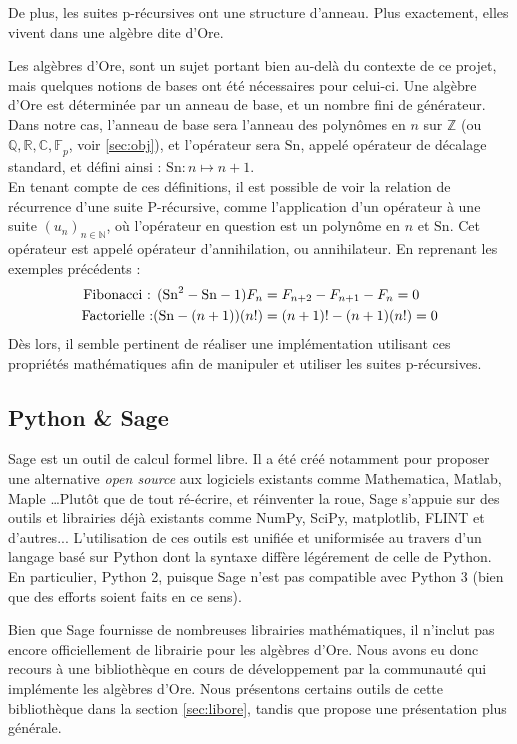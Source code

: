 \documentclass[12pt]{article}
\newcommand{\Sn}{\mathrm{Sn}}
\begin{document}
        De plus, les suites p-récursives ont une structure d'anneau. Plus exactement,
        elles vivent dans une algèbre dite d'Ore.\\
        \par Les algèbres d'Ore, sont un sujet
        portant bien au-delà du contexte de ce projet, mais quelques notions de bases
        ont été nécessaires pour celui-ci. Une algèbre d'Ore est déterminée par un
        anneau de base, et un nombre fini de générateur. Dans notre cas, l'anneau de base
        sera l'anneau des polynômes en $n$ sur $\mathbb Z$ (ou $\mathbb {Q,R,C,F}_p$, voir
        \ref{sec:obj}), et l'opérateur sera $\Sn$, appelé opérateur de décalage standard, et
        défini ainsi : $\Sn : n\mapsto n+1$.\\
        En tenant compte de ces définitions,
        il est possible de voir la relation de récurrence d'une suite P-récursive,
        comme l'application d'un opérateur à une suite $(u_n)_{n\in\mathbb N}$,
        où l'opérateur en question est un polynôme en $n$ et $\Sn$. Cet opérateur
        est appelé opérateur d'annihilation, ou annihilateur. En reprenant les exemples
        précédents :
        \begin{align*}
            \textnormal{Fibonacci : } (\Sn^2 - \Sn - 1)F_n &= F_{n+2} - F_{n+1} - F_n = 0\\
            \textnormal{Factorielle :} (\Sn - (n+1))(n!) &= (n+1)! - (n+1)(n!) = 0\\
        \end{align*}
        Dès lors, il semble pertinent
        de réaliser une implémentation utilisant ces propriétés mathématiques afin de
        manipuler et utiliser les suites p-récursives.\\
    \subsection{Python \& Sage}
        \label{sec:sage}
        \par Sage est un outil de calcul formel libre.
        Il a été créé notamment pour proposer
        une alternative \textit{open source} aux logiciels existants comme Mathematica,
        Matlab, Maple \ldots Plutôt que de tout ré-écrire, et réinventer la roue,
        Sage s'appuie sur des outils
        et librairies déjà existants comme NumPy, SciPy, matplotlib, FLINT et d'autres...
        L'utilisation de ces outils est unifiée et uniformisée au travers d'un langage
        basé sur Python dont la syntaxe diffère légérement de celle
        de Python. En particulier, Python 2, puisque Sage n'est pas compatible avec Python 3
        (bien que des efforts soient faits en ce sens).
        \par Bien que Sage fournisse de nombreuses librairies mathématiques,
        il n'inclut pas encore officiellement de librairie pour les algèbres d'Ore.
        Nous avons eu donc recours à une bibliothèque en cours de développement par
        la communauté qui implémente les algèbres d'Ore. Nous présentons certains outils
        de cette bibliothèque
        dans la section \ref{sec:libore}, tandis que \cite{ore_pols} propose une
        présentation plus générale.
\end{document}

